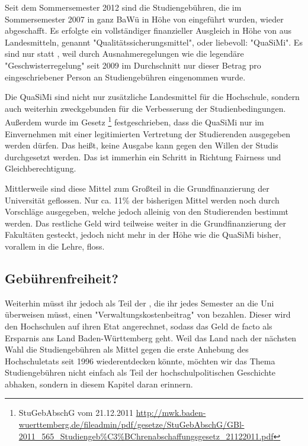 %

\newpage
{}%
Seit dem Sommersemester 2012 sind die Studiengebühren, die im Sommersemester
2007 in ganz BaWü in Höhe von  eingeführt wurden, wieder abgeschafft.
Es erfolgte ein vollständiger finanzieller Ausgleich in Höhe von  aus
Landesmitteln, genannt "Qualitätssicherungsmittel", oder liebevoll: "QuaSiMi".
Es sind nur  statt , weil durch Ausnahmeregelungen wie die
legendäre "Geschwisterregelung" seit 2009 im Durchschnitt nur dieser Betrag pro
eingeschriebener Person an Studiengebühren eingenommen wurde.

Die QuaSiMi sind nicht nur zusätzliche Landesmittel für die Hochschule, sondern
auch weiterhin zweckgebunden für die Verbesserung der Studienbedingungen.
Außerdem wurde im Gesetz \footnote{StuGebAbschG vom 21.12.2011
\url{http://mwk.baden-wuerttemberg.de/fileadmin/pdf/gesetze/StuGebAbschG/GBl-2011_565_Studiengeb\%C3\%BChrenabschaffungsgesetz_21122011.pdf}}
festgeschrieben, dass die QuaSiMi nur im Einvernehmen mit einer legitimierten
Vertretung der Studierenden ausgegeben werden dürfen. Das heißt, keine Ausgabe
kann gegen den Willen der Studis durchgesetzt werden. Das ist immerhin ein
Schritt in Richtung Fairness und Gleichberechtigung.

Mittlerweile sind diese Mittel zum Großteil in die Grundfinanzierung der
Universität geflossen. Nur ca. 11\% der bisherigen Mittel werden noch durch
Vorschläge ausgegeben, welche jedoch alleinig von den Studierenden bestimmt
werden. Das restliche Geld wird teilweise weiter in die Grundfinanzierung der
Fakultäten gesteckt, jedoch nicht mehr in der Höhe wie die QuaSiMi bisher,
vorallem in die Lehre, floss.

\subsection*{Gebührenfreiheit?}
Weiterhin müsst ihr jedoch als Teil der \EUR{\beitragssumme}, die ihr jedes
Semester an die Uni überweisen müsst, einen "Verwaltungskostenbeitrag" von
\EUR{\verwaltungsbetrag} bezahlen. Dieser wird den Hochschulen auf ihren Etat
angerechnet, sodass das Geld de facto als Ersparnis ans Land Baden-Württemberg
geht. Weil das Land nach der nächsten Wahl die Studiengebühren als Mittel gegen
die erste Anhebung des Hochschuletats seit 1996 wiederentdecken könnte, möchten
wir das Thema Studiengebühren nicht einfach als Teil der hochschulpolitischen
Geschichte abhaken, sondern in diesem Kapitel daran erinnern.
\iffalse
Wir laden Euch darüberhinaus ein, Euch über die Hintergründe der
Studiengebühren zu informieren, beispielsweise auf unserer Fachschaftshomepage
\footnote{http://mathphys.fsk.uni-heidelberg.de/studgeb-historie.html}.
\fi
%


